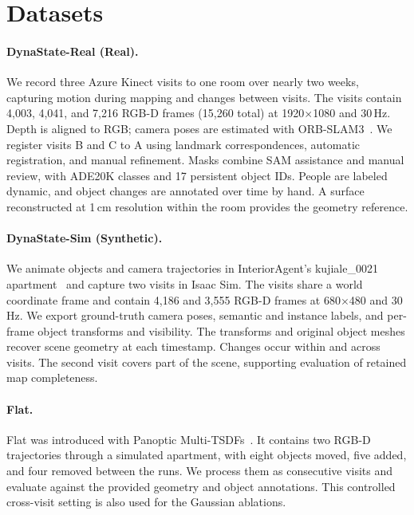 \section{Datasets}

\paragraph{DynaState-Real (Real).}
We record three Azure Kinect visits to one room over nearly two weeks, capturing motion during mapping
and changes between visits. The visits contain 4,003, 4,041, and 7,216 RGB-D frames (15,260 total) at
1920$\times$1080 and 30\,Hz. Depth is aligned to RGB; camera poses are estimated with
ORB-SLAM3~\cite{campos2021orbslam3}. We register visits B and C to A using landmark correspondences,
automatic registration, and manual refinement. Masks combine SAM assistance and manual review,
with ADE20K classes and 17 persistent object IDs. People are labeled dynamic, and object changes
are annotated over time by hand. A surface reconstructed at 1\,cm resolution within the room
provides the geometry reference.

\paragraph{DynaState-Sim (Synthetic).}
We animate objects and camera trajectories in InteriorAgent's kujiale\_0021 apartment~\cite{InteriorAgent2025}
and capture two visits in Isaac Sim. The visits share a world coordinate frame and contain 4,186 and
3,555 RGB-D frames at 680$\times$480 and 30\,Hz. We export ground-truth camera poses, semantic and
instance labels, and per-frame object transforms and visibility. The transforms and original object
meshes recover scene geometry at each timestamp. Changes occur within and across visits. The second
visit covers part of the scene, supporting evaluation of retained map completeness.

\paragraph{Flat.}
Flat was introduced with Panoptic Multi-TSDFs~\cite{schmid2022panoptic}. It contains two RGB-D trajectories
through a simulated apartment, with eight objects moved, five added, and four removed between the runs.
We process them as consecutive visits and evaluate against the provided geometry and object annotations.
This controlled cross-visit setting is also used for the Gaussian ablations.

